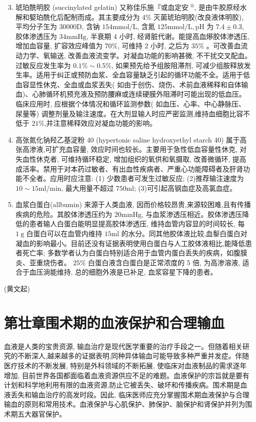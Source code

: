 \documentclass[10pt]{article}
\begin{document}
\begin{enumerate}
  \setcounter{enumi}{2}
  \item 琥珀酰明胶 (succinylated gelatin) 又称佳乐施『或血定安 ${ }^{\circledR}$, 是由牛胶原经水解和婜珀酰化后配制而成。其主要成分为 $4 \%$ 灭菌琥珀明胶(改良液体明胶), 平均分子玍为 $30000 \mathrm{D}$, 含钠 $154 \mathrm{mmol} / \mathrm{L}$, 含氮 $125 \mathrm{mmol} / \mathrm{L}, \mathrm{pH}$ 为 $7.4 \pm 0.3$, 胶体渗透压为 $34 \mathrm{mmHg}$, 半衰期 4 小时, 经肾脏代谢。能提高血熪胶体渗透压, 增加血容量, 扩容效应峰值为 $70 \%$, 可维持 2 小时, 之后为 $35 \%$ 。可改善血流动力学、氧输送, 改善血液流变学。对凝血功能的影响甚微, 不干扰交叉配血。过敏反应发生率为 $0.1 \% \sim 0.5 \%$, 如果预先给予组胺阻滞剂, 可减少组胺释放发生率。适用于纠正或预防血浆、全血容量缺乏引起的循环功能不全。适用于低血容显性休克、全血或血浆丟失( 如由于创伤、烧伤、术前血液稀释和自体输血)、心肺循环机预充液及预防腰麻或连续硬膜外阻滞时可能出现的低血压。临床应用时, 应根据个体情况和循环监测参数( 如血压、心率、中心静脉压、尿量等) 调整剂量及输注速度。在大剂显输人时应严密监测,维持血细胞比容不低于 $21 \%$,并注意稀释效应对凝血功能的影响。

  \item 高张氮化钠羟乙基淀粉 40 (hypertonic saline hydroxyethyl starch 40) 属于高张高渗液,可扩充血容量, 效应时间也较长。主要用于急性低血容量性休克, 对失血性休克者, 可维持循环稳定, 增加组织的氧供和氧摄取, 改善微循环, 提高成活率。禁用于对本药过敏者、有出血性疾病者、严重心功能障碍者及肝肾功能不全者。应用时应注意: (1) 少数患者可发生过敏反应; (2)推荐输注速度为 $10 \sim 15 \mathrm{ml} / \mathrm{min}$, 最大用量不超过 $750 \mathrm{ml}$; (3)可引起高钢血症及高氯血症。

  \item 血浆白蛋白(allbumin) 来源于人类血液, 因而价格较昂贵,来源较困难,且有传播疾病的危险。其胶体渗透压约为 $20 \mathrm{mmHg}$, 与血浆渗透压相近。胶体渗透压降低的患者输人白蛋白能明显提高胶体渗透压, 维持血管内容显的时间较长, 每 $1 \mathrm{~g}$ 白蛋白可以在血管内维持 $15 \mathrm{ml}$ 的水分。同其他胶体液比较,血㴝白蛋白对凝血的影响最小。目前还没有证据表明使用白蛋白与人工胶体液相比,能降低患者死亡率; 多数学者认为白蛋白特别适合用于血管内蛋白丢失的疾病，如腹膜炎、亚重烧伤者。 $25 \%$ 白蛋白液含白蛋白是正常浓度的 5 倍, 为高渗溶液, 适合于血压淌能维持, 总的细胞外液是已补足, 血浆容星下降的患者。

\end{enumerate}

(黄文起)

\section*{第壮章围术期的血液保护和合理输血}
血液是人类的宝贵资源, 输血治疗是现代医学重要的治疗手段之一。但随着相关研究的不断深人,越来越多的证据表明,同种异体输血可能导致多种严重并发症。伴随医疗技术的不断发展, 特别是外科领域的不断拓展, 使临床对血液制品的需求逐年增加, 目前世界各国都面临着血液资源供应不足的难题。血液保护的宗旨就是要有计划和科学地利用有限的血液资源,防止它被丢失、破坏和传播疾病。围术期是血液丢失和输血治疗的高发时段。因此, 临床医师应充分掌握围术期血液保护与合理输血的原则和常用技术。血液保护与心肌保护、肺保护、脑保护和肾保护并列为围术期五大器官保护。
\end{document}
